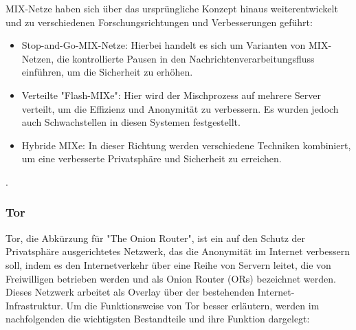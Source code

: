 MIX-Netze haben sich über das ursprüngliche Konzept hinaus weiterentwickelt und zu verschiedenen Forschungsrichtungen und Verbesserungen geführt:

\begin{itemize}

\item Stop-and-Go-MIX-Netze: Hierbei handelt es sich um Varianten von MIX-Netzen, die kontrollierte Pausen in den Nachrichtenverarbeitungsfluss einführen, um die Sicherheit zu erhöhen.

\item Verteilte "Flash-MIXe": Hier wird der Mischprozess auf mehrere Server verteilt, um die Effizienz und Anonymität zu verbessern. Es wurden jedoch auch Schwachstellen in diesen Systemen festgestellt.

\item Hybride MIXe: In dieser Richtung werden verschiedene Techniken kombiniert, um eine verbesserte Privatsphäre und Sicherheit zu erreichen\footnotemark{}.

\end{itemize}.

\subsubsection{Tor}

Tor, die Abkürzung für "The Onion Router", ist ein auf den Schutz der Privatsphäre ausgerichtetes Netzwerk, das die Anonymität im Internet verbessern soll, indem es den Internetverkehr über eine Reihe von Servern leitet, die von Freiwilligen betrieben werden und als Onion Router (ORs) bezeichnet werden. Dieses Netzwerk arbeitet als Overlay über der bestehenden Internet-Infrastruktur. Um die Funktionsweise von Tor besser erläutern, werden im nachfolgenden die wichtigsten Bestandteile und ihre Funktion dargelegt:

